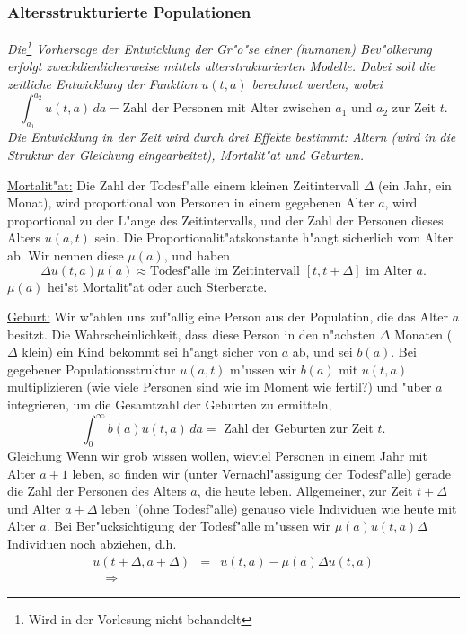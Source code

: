 \subsubsection{ Altersstrukturierte Populationen}\par
{\it Die\footnote{Wird in der Vorlesung nicht behandelt} Vorhersage der Entwicklung der Gr"o"se einer (humanen) Bev"olkerung erfolgt 
zweckdienlicherweise mittels alterstrukturierten Modelle. Dabei soll die
zeitliche Entwicklung der Funktion $u(t,a)$ berechnet werden, wobei
$$ \int_{a_1}^{a_2} u(t,a)\, da = \mbox{Zahl der Personen mit Alter zwischen }
a_1 \mbox{ und } a_2 \mbox{ zur Zeit } t.$$
Die  Entwicklung in der Zeit wird durch drei Effekte bestimmt: 
Altern (wird in die Struktur der Gleichung eingearbeitet), 
Mortalit"at und Geburten.\par
\underline{Mortalit"at:} 
Die Zahl der Todesf"alle einem kleinen Zeitintervall $\Delta$ 
(ein Jahr, ein Monat), wird proportional von Personen in 
einem gegebenen Alter $a$, wird proportional zu der L"ange des Zeitintervalls,
und der Zahl der Personen dieses Alters $u(a,t)$ sein. Die Proportionalit"atskonstante h"angt sicherlich vom Alter ab. Wir nennen diese 
 $\mu(a)$, und haben
$$ \Delta u(t,a)\mu(a)\approx
\mbox{Todesf"alle im Zeitintervall } [t,t+\Delta] 
\mbox{ im Alter } a.$$
$\mu(a)$ hei"st Mortalit"at oder auch Sterberate.\par
\underline{Geburt:} Wir w"ahlen uns zuf"allig eine Person 
aus der Population, die das Alter $a$ besitzt. Die Wahrscheinlichkeit, 
dass diese Person in den n"achsten $\Delta$ Monaten ($\Delta$ klein) 
ein Kind bekommt sei h"angt sicher von $a$ ab, und sei $b(a)$.
Bei gegebener Populationsstruktur $u(a,t)$ m"ussen wir $b(a)$ mit
$u(t,a)$ multiplizieren (wie viele Personen sind wie im Moment wie fertil?) und
"uber $a$ integrieren, um die Gesamtzahl der Geburten zu ermitteln,
$$ \int_0^\infty b(a)u(t,a)\, da = \mbox{ Zahl der Geburten zur Zeit }t.$$
\underline{Gleichung } 
Wenn wir grob wissen wollen, wieviel Personen in einem Jahr mit Alter
$a+1$ leben, so finden wir (unter Vernachl"assigung der Todesf"alle) gerade die
Zahl der Personen des Alters $a$, die heute leben. Allgemeiner, zur Zeit 
$t+\Delta$ und Alter $a+\Delta$ leben '(ohne Todesf"alle) genauso viele 
Individuen wie heute mit Alter $a$. Bei Ber"ucksichtigung der Todesf"alle m"ussen wir
$\mu(a) u(t,a)\Delta$ Individuen noch abziehen, d.h.
\begin{eqnarray*}
u(t+\Delta, a+\Delta) &= &  u(t,a) - \mu(a)\Delta u(t,a)\\
\quad\Rightarrow\quad

\end{eqnarray*}}
